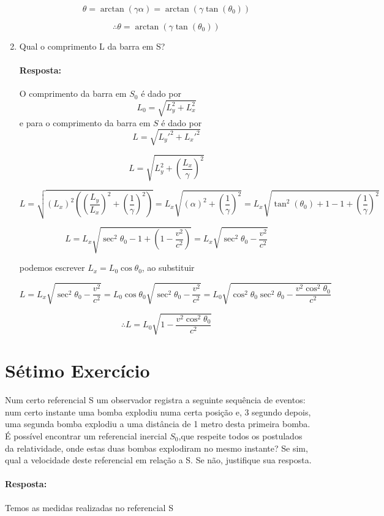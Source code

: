 \documentclass[10pt,a4paper]{article}
\begin{document}
\begin{enumerate}
		 $$\theta = \arctan(\gamma\alpha) = \arctan(\gamma\tan (\theta_0))$$
		 
		$$ \therefore \theta  = \arctan(\gamma\tan (\theta_0))$$
		
		\item Qual o comprimento L da barra em S?
		 \paragraph{Resposta:}
		 O comprimento da barra em $ S_0 $ é dado por
		 $$ L_0 = \sqrt{L_y^2+L_x^2}$$
		 e para o comprimento da barra em $ S $ é dado por
		 $$ L= \sqrt{L_y'^2+L_x'^2}$$
		 
		 $$ L= \sqrt{L_y^2+\left(\dfrac{L_x}{\gamma}\right)^2}$$
		 
		 $$ L= \sqrt{(L_x)^2\left(\left(\dfrac{L_y}{L_x}\right)^2+\left(\dfrac{1}{\gamma}\right)^2\right)} = L_x \sqrt{(\alpha)^2+\left(\dfrac{1}{\gamma}\right)^2} = L_x \sqrt{\tan^2 (\theta_0)+ 1 - 1 + \left(\dfrac{1}{\gamma}\right)^2} $$
		 
		 $$ L= L_x \sqrt{\sec^2 \theta_0 - 1 + \left(1 - \frac{v^2}{c^2}\right)} = L_x \sqrt{\sec^2 \theta_0 - \frac{v^2}{c^2}}$$
		 
		 podemos escrever $ L_x = L_0 \cos\theta_0$, ao substituir
		 
		 $$L=  L_x  \sqrt{\sec^2 \theta_0 - \frac{v^2}{c^2}} = L_0 \cos\theta_0\sqrt{\sec^2 \theta_0 - \frac{v^2}{c^2}} = L_0 \sqrt{\cos^2\theta_0\sec^2 \theta_0 - \frac{v^2\cos^2\theta_0}{c^2}}  $$
		 
		 $$\therefore L= L_0 \sqrt{1 - \frac{v^2\cos^2\theta_0}{c^2}}$$
	\end{enumerate}
	
	
	\section{Sétimo Exercício}
	Num certo referencial S um observador registra a seguinte sequência de eventos: num certo instante uma bomba explodiu numa certa posição e, 3 segundo depois, uma segunda bomba explodiu a uma distância de 1 metro
	desta primeira bomba. É possível encontrar um referencial inercial $ S_0 $,que respeite todos os postulados da relatividade, onde estas duas bombas explodiram no mesmo instante? Se sim, qual a velocidade deste referencial
	em relação a S. Se não, justifique sua resposta.
	
	\paragraph{Resposta:}
	Temos as medidas realizadas no referencial S
	
\end{document}

